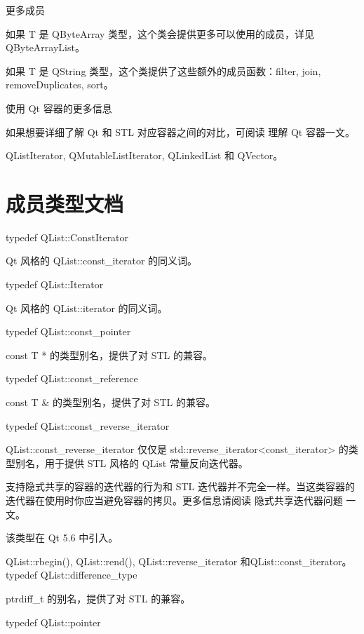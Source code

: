 
更多成员

如果 T 是 QByteArray 类型，这个类会提供更多可以使用的成员，详见 QByteArrayList。

如果 T 是 QString 类型，这个类提供了这些额外的成员函数：filter, join, removeDuplicates, sort。

使用 Qt 容器的更多信息

如果想要详细了解 Qt 和 STL 对应容器之间的对比，可阅读 理解 Qt 容器一文。

\begin{seeAlso}
QListIterator, QMutableListIterator, QLinkedList 和 QVector。
\end{seeAlso}

\section{成员类型文档}

typedef QList::ConstIterator

Qt 风格的 QList::const\_iterator 的同义词。

typedef QList::Iterator

Qt 风格的 QList::iterator 的同义词。

typedef QList::const\_pointer

const T * 的类型别名，提供了对 STL 的兼容。

typedef QList::const\_reference

const T \& 的类型别名，提供了对 STL 的兼容。

typedef QList::const\_reverse\_iterator

QList::const\_reverse\_iterator 仅仅是 std::reverse\_iterator<const\_iterator> 的类型别名，用于提供 STL 风格的 QList 常量反向迭代器。

\begin{notice}
支持隐式共享的容器的迭代器的行为和 STL 迭代器并不完全一样。当这类容器的迭代器在使用时你应当避免容器的拷贝。更多信息请阅读 隐式共享迭代器问题 一文。
\end{notice}

该类型在 Qt 5.6 中引入。

\begin{seeAlso}
QList::rbegin(), QList::rend(), QList::reverse\_iterator 和QList::const\_iterator。
typedef QList::difference\_type
\end{seeAlso}

ptrdiff\_t 的别名，提供了对 STL 的兼容。

typedef QList::pointer

